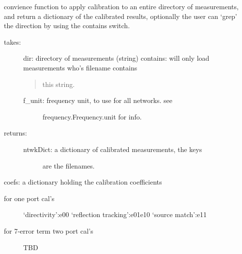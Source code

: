 \documentclass[letterpaper,10pt,english]{sphinxmanual}
\begin{document}
\begin{fulllineitems}

\begin{fulllineitems}
\label{auto_calibration:mwavepy.Calibration.apply_cal_to_all_in_dir}
convience function to apply calibration to an entire directory
of measurements, and return a dictionary of the calibrated
results, optionally the user can `grep' the direction
by using the contains switch.
\begin{description}
\item[{takes:}] \leavevmode
dir: directory of measurements (string)
contains: will only load measurements who's filename contains
\begin{quote}

this string.
\end{quote}
\begin{description}
\item[{f\_unit: frequency unit, to use for all networks. see}] \leavevmode
frequency.Frequency.unit for info.

\end{description}

\item[{returns:}] \leavevmode\begin{description}
\item[{ntwkDict: a dictionary of calibrated measurements, the keys}] \leavevmode
are the filenames.

\end{description}

\end{description}

\end{fulllineitems}


\begin{fulllineitems}
\label{auto_calibration:mwavepy.Calibration.coefs}
coefs: a dictionary holding the calibration coefficients
\begin{description}
\item[{for one port cal's}] \leavevmode
`directivity':e00
`reflection tracking':e01e10
`source match':e11

\item[{for 7-error term two port cal's}] \leavevmode
TBD


\end{description}
\end{fulllineitems}
\end{fulllineitems}
\end{document}
